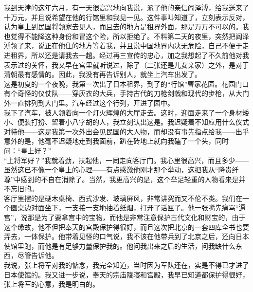 我到天津的这年六月，有一天很高兴地向我说，派了他的亲信阎泽溥，给我送来了十万元，并且说希望在他的行馆里和我见一见。这件事叫知道了，立刻表示反对，认为皇上到民国将领家去见人，而且去的地方是租界外面，那是万万不可以的。我也觉得不能降这种身份和冒这个险，所以拒绝了。不料第二天的夜里，突然把阎泽溥领了来，说正在他住的地方等着我，并且说中国地界内决无危险，自己不便于走进租界，所以还是请我去一趟。经过再三宣传的忠心，加之我想起了不久前他对我表示过的关怀，我又早在宫里就听说过，除了（二张还是儿女亲家）之外，是对于清朝最有感情的。因此，我没有再告诉别人，就坐上汽车出发了。\\

这是初夏的一个夜晚，我第一次出了日本租界，到了的“行馆”曹家花园。花园门口有个奇怪的仪仗队——穿灰衣的大兵，手持古代的刀枪剑戟和现代的步枪，从大门外一直排列到大门里。汽车经过这个行列，开进了园中。\\

我下了汽车，被人领着向一个灯火辉煌的大厅走去。这时，迎面走来了一个身材矮小、便装打扮、留着小八字胡的人，我立刻认出这是。我迟疑着不知应用什么仪式对待他——这是我第一次外出会见民国的大人物，而却没有事先指点给我——出乎意外的是，他毫不迟疑地走到我面前，趴在砖地上就向我磕了一个头，同时问：“皇上好？”\\

“上将军好？”我就着劲，扶起他，一同走向客厅门。我心里很高兴，而且多少——虽然这已不像一个皇上的心理——有点感激他刚才那个举动，这把我从“降贵纤尊”中感到的不自在消除了。当然，我更高兴的是，这个举足轻重的人物看来是并不忘旧的。\\

客厅里摆的是硬木桌椅、西式沙发、玻璃屏风，非常讲究而又不伦不类。我们在一个圆桌边对面坐下，一支接一支地抽着纸烟，打开了话匣子。他一张嘴先痛骂“逼宫”，说那是为了要拿宫中的宝物，而他是非常注意保护古代文化和财宝的，由于这个缘故，他不但把奉天的宫殿保护得很好，而且这次把北京的一套四库全书也要弄去，一体保护。他带着见怪的口气说，我不该在他带兵到了北京之后，还向日本使馆里跑，而他是有足够力量保护我的。他问我出来之后的生活，问我缺什么东西，尽管告诉他。\\

我说，张上将军对我的惦念，我完全知道，当时因为军队还在，实是不得已才进了日本使馆的。我又进一步说，奉天的宗庙陵寝和宫殿，我早已知道都保护得很好，张上将军的心意，我是明白的。\\

